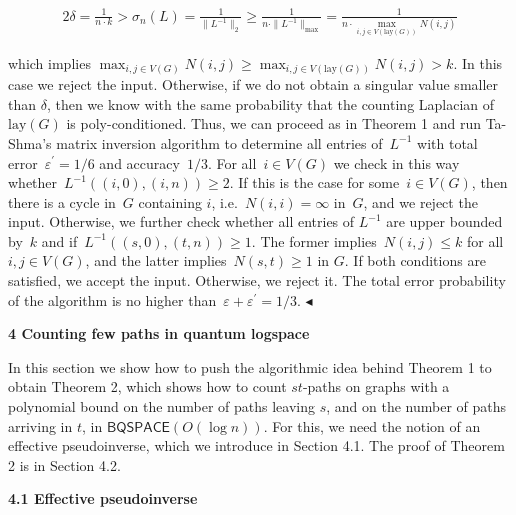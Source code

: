 \[\begin{gathered}
\displaystyle 2\delta=\frac{1}{n\cdot k}>\sigma_{n}(L)=\frac{1}{\|L^{-1}\|_{2}}\geq\frac{1}{n\cdot\|L^{-1}\|_{\max}}=\frac{1}{n\cdot\max_{i,j\in V(\mathrm{lay}(G))}N(i,j)}
\end{gathered}\]


which implies $\max_{i,j\in V(G)}N(i,j)\geq\max_{i,j\in V(\mathrm{lay}(G))}N(i,j)>k$.
In this case we reject the input.
Otherwise, if we do not obtain a singular value smaller than $\delta$, then we know with the same probability that the counting Laplacian of $\mathrm{lay}(G)$ is poly-conditioned.
Thus, we can proceed as in Theorem 1 and run Ta-Shma’s matrix inversion algorithm to determine all entries of $L^{-1}$ with total error $\varepsilon^{\prime}=1/6$ and accuracy $1/3$.
For all $i\in V(G)$ we check in this way whether $L^{-1}((i,0),(i,n))\geq 2$. If this is the case for some $i\in V(G)$, then there is a cycle in $G$ containing $i$, i.e. $N(i,i)=\infty$ in $G$, and we reject the input.
Otherwise, we further check whether all entries of $L^{-1}$ are upper bounded by $k$ and if $L^{-1}((s,0),(t,n))\geq 1$.
The former implies $N(i,j)\leq k$ for all $i,j\in V(G)$, and the latter implies $N(s,t)\geq 1$ in $G$.
If both conditions are satisfied, we accept the input.
Otherwise, we reject it.
The total error probability of the algorithm is no higher than $\varepsilon+\varepsilon^{\prime}=1/3$.
$\blacktriangleleft$\par







\par\medskip\noindent\textbf{
4 Counting few paths in quantum logspace}\par




In this section we show how to push the algorithmic idea behind Theorem 1 to obtain Theorem 2, which shows how to count $st$-paths on graphs with a polynomial bound on the number of paths leaving $s$, and on the number of paths arriving in $t$, in $\mathsf{BQSPACE}(O(\log n))$.
For this, we need the notion of an effective pseudoinverse, which we introduce in Section 4.1.
The proof of Theorem 2 is in Section 4.2.\par




\par\medskip\noindent\textbf{
4.1 Effective pseudoinverse}\par




